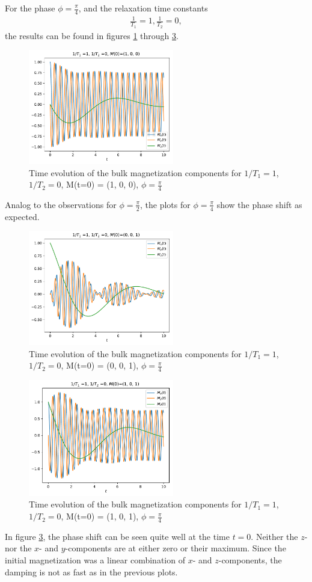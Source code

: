 \documentclass[journal]{IEEEtran} %
\begin{document}
For the phase $\phi = \frac{\pi}{4}$, and the relaxation time constants
\begin{align}
    \frac{1}{T_1} = 1, \frac{1}{T_2} = 0,
\end{align}
the results can be found in figures \ref{f7} through \ref{f9}.
\begin{figure}[H]
\centering
\includegraphics[width=2.5in]{figs/NMR_T1-1_T2-0_Minit-100_tau_0.01_t_10_phase_pi_4.pdf}
\caption{Time evolution of the bulk magnetization components for $1/T_1 = 1$, $1/T_2 = 0$, M(t=0) = (1, 0, 0), $\phi = \frac{\pi}{4}$}
\label{f7}
\end{figure}
Analog to the observations for $\phi = \frac{\pi}{2}$, the plots for $\phi = \frac{\pi}{4}$ show the phase shift as expected.
\begin{figure}[H]
\centering
\includegraphics[width=2.5in]{figs/NMR_T1-1_T2-0_Minit-001_tau_0.01_t_10_phase_pi_4.pdf}
\caption{Time evolution of the bulk magnetization components for $1/T_1 = 1$, $1/T_2 = 0$, M(t=0) = (0, 0, 1), $\phi = \frac{\pi}{4}$}
\label{f8}
\end{figure}
\begin{figure}[H]
\centering
\includegraphics[width=2.5in]{figs/NMR_T1-1_T2-0_Minit-101_tau_0.01_t_10_phase_pi_4.pdf}
\caption{Time evolution of the bulk magnetization components for $1/T_1 = 1$, $1/T_2 = 0$, M(t=0) = (1, 0, 1), $\phi = \frac{\pi}{4}$}
\label{f9}
\end{figure}
In figure \ref{f9}, the phase shift can be seen quite well at the time $t=0$. Neither the $z$- nor the $x$- and $y$-components are at either zero or their maximum. Since the initial magnetization was a linear combination of $x$- and $z$-components, the damping is not as fast as in the previous plots.  
\end{document}
